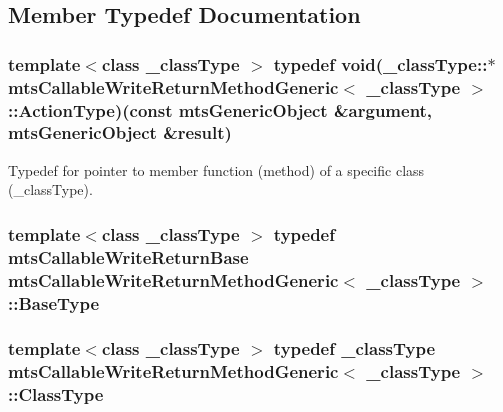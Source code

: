 \subsection{Member Typedef Documentation}
\hypertarget{classmts_callable_write_return_method_generic_a4316e9ab3973c5b01799864a32167400}{
\subsubsection[{Action\-Type}]{\setlength{\rightskip}{0pt plus 5cm}template$<$class \-\_\-class\-Type $>$ typedef void(\-\_\-class\-Type\-::$\ast$ {\bf mts\-Callable\-Write\-Return\-Method\-Generic}$<$ \-\_\-class\-Type $>$\-::Action\-Type)(const {\bf mts\-Generic\-Object} \&argument, {\bf mts\-Generic\-Object} \&result)}}\label{classmts_callable_write_return_method_generic_a4316e9ab3973c5b01799864a32167400}
Typedef for pointer to member function (method) of a specific class (\-\_\-class\-Type). \hypertarget{classmts_callable_write_return_method_generic_a45af3bcddc1608f32979dd6770b341ad}{
\subsubsection[{Base\-Type}]{\setlength{\rightskip}{0pt plus 5cm}template$<$class \-\_\-class\-Type $>$ typedef {\bf mts\-Callable\-Write\-Return\-Base} {\bf mts\-Callable\-Write\-Return\-Method\-Generic}$<$ \-\_\-class\-Type $>$\-::{\bf Base\-Type}}}\label{classmts_callable_write_return_method_generic_a45af3bcddc1608f32979dd6770b341ad}
\hypertarget{classmts_callable_write_return_method_generic_a32ecf59575aa52541be0693586a2319d}{
\subsubsection[{Class\-Type}]{\setlength{\rightskip}{0pt plus 5cm}template$<$class \-\_\-class\-Type $>$ typedef \-\_\-class\-Type {\bf mts\-Callable\-Write\-Return\-Method\-Generic}$<$ \-\_\-class\-Type $>$\-::{\bf Class\-Type}}}\label{classmts_callable_write_return_method_generic_a32ecf59575aa52541be0693586a2319d}
